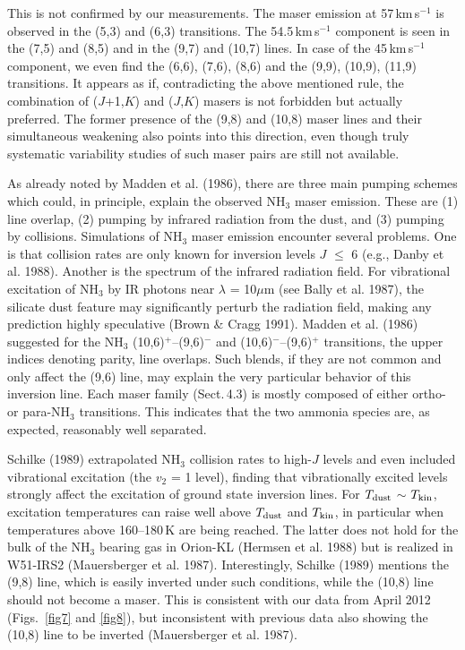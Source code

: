 \documentclass[oldversion]{aa}
\begin{document}
This is not confirmed by our measurements. The maser emission
at 57\,km\,s$^{-1}$ is observed in the (5,3) and (6,3) 
transitions. The 54.5\,km\,s$^{-1}$ component is seen 
in the (7,5) and (8,5) and in the (9,7) and (10,7) lines. 
In case of the 45\,km\,s$^{-1}$ component, we even find the 
(6,6), (7,6), (8,6) and the (9,9), (10,9), (11,9) transitions. 
It appears as if, contradicting the above mentioned rule, the
combination of ($J$+1,$K$) and ($J$,$K$) masers is not
forbidden but actually preferred. The former presence 
of the (9,8) and (10,8) maser lines and their simultaneous
weakening also points into this direction, even though truly
systematic variability studies of such maser pairs are still
not available.

As already noted by Madden et al. (1986), there are three
main pumping schemes which could, in principle, explain the 
observed NH$_3$ maser emission. These are (1) line overlap, 
(2) pumping by infrared radiation from the dust, and (3) 
pumping by collisions. Simulations of NH$_3$ maser 
emission encounter several problems. One is that collision rates 
are only known for inversion levels $J$ $\leq$ 6 (e.g., Danby 
et al. 1988). Another is the spectrum of the infrared radiation field.
For vibrational excitation of NH$_3$ by IR photons near $\lambda$
= 10$\mu$m (see Bally et al. 1987), the silicate dust 
feature may significantly perturb the radiation field, making 
any prediction highly speculative (Brown \& Cragg 1991). Madden 
et al. (1986) suggested for the NH$_3$ (10,6)$^+$--(9,6)$^-$ and 
(10,6)$^-$--(9,6)$^+$ transitions, the upper indices denoting 
parity, line overlaps. Such blends, if they are not common and 
only affect the (9,6) line, may explain the very particular 
behavior of this inversion line. Each maser family (Sect.\,4.3) 
is mostly composed of either ortho- or para-NH$_3$ transitions. 
This indicates that the two ammonia species are, as expected, 
reasonably well separated.

Schilke (1989) extrapolated NH$_3$ collision rates to high-$J$
levels and even included vibrational excitation (the $v_2$ = 1 
level), finding that vibrationally excited levels strongly 
affect the excitation of ground state inversion lines. For 
$T_{\rm dust}$ $\sim$ $T_{\rm kin}$, excitation temperatures 
can raise well above $T_{\rm dust}$ and $T_{\rm kin}$, in 
particular when temperatures above 160--180\,K are being reached. 
The latter does not hold for the bulk of the NH$_3$ bearing gas 
in Orion-KL (Hermsen et al. 1988) but is realized in W51-IRS2 
(Mauersberger et al. 1987). Interestingly, Schilke (1989) 
mentions the (9,8) line, which is easily inverted under such 
conditions, while the (10,8) line should not become a maser. 
This is consistent with our data from April 2012 (Figs.~\ref{fig7} 
and \ref{fig8}), but inconsistent with previous data also 
showing the (10,8) line to be inverted (Mauersberger et al. 1987).
\end{document}

